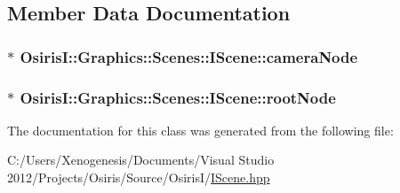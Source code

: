 \subsection{Member Data Documentation}
\hypertarget{class_osiris_i_1_1_graphics_1_1_scenes_1_1_i_scene_a6110c134bb387c2162830254594710ad}{
\subsubsection[{camera\-Node}]{$\ast$ Osiris\-I\-::\-Graphics\-::\-Scenes\-::\-I\-Scene\-::camera\-Node\hspace{0.3cm}{\ttfamily [protected]}}}\label{class_osiris_i_1_1_graphics_1_1_scenes_1_1_i_scene_a6110c134bb387c2162830254594710ad}
\hypertarget{class_osiris_i_1_1_graphics_1_1_scenes_1_1_i_scene_a5f6c74ea4fbcd21332c8ead245ee1e44}{
\subsubsection[{root\-Node}]{$\ast$ Osiris\-I\-::\-Graphics\-::\-Scenes\-::\-I\-Scene\-::root\-Node\hspace{0.3cm}{\ttfamily [protected]}}}\label{class_osiris_i_1_1_graphics_1_1_scenes_1_1_i_scene_a5f6c74ea4fbcd21332c8ead245ee1e44}


The documentation for this class was generated from the following file\-:\begin{DoxyCompactItemize}
\item 
C\-:/\-Users/\-Xenogenesis/\-Documents/\-Visual Studio 2012/\-Projects/\-Osiris/\-Source/\-Osiris\-I/\hyperlink{_i_scene_8hpp}{I\-Scene.\-hpp}\end{DoxyCompactItemize}

